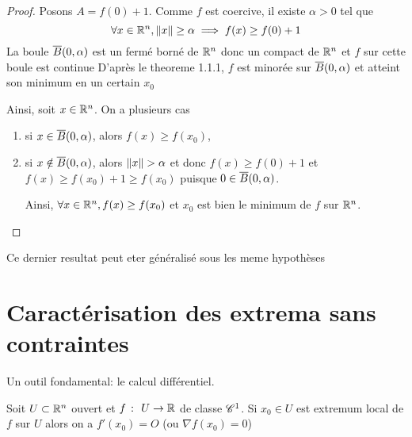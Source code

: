 \begin{proof}
    Posons \(A = f(0) + 1\). Comme \(f\) est coercive, il existe \(\alpha > 0\) tel que
    \begin{equation*}
        \forall x\in\mathbb{R}^n, \mathopen{}\left\|x\right\|\mathclose{}\geq \alpha \implies f(x) \geq  f(0) + 1
    \end{equation*}
    La boule \(\overline{B}(0, \alpha)\) est un fermé borné de \(\mathbb{R}^n\) %
    donc un compact de \(\mathbb{R}^n\) et \(f\) sur cette boule est continue %
    D'après le theoreme 1.1.1, \(f\) est minorée sur \(\overline{B}(0, \alpha)\) et atteint son minimum en un certain  %
    \(x_0\)

    Ainsi, soit \(x\in\mathbb{R}^n\). On a plusieurs cas
    \begin{enumerate}[label = (\alpha*)]
        \item si \(x\in \overline{B}(0, \alpha)\), alors \(f(x)\geq f(x_0)\),

        \item si \(x\notin \overline{B}(0, \alpha)\), alors \(\mathopen{}\left\|x\right\|\mathclose{} > \alpha\) et 
        donc \(f(x)\geq f(0) + 1\) et \(f(x)\geq f(x_0) + 1 \geq f(x_0)\)
        puisque \(0\in \overline{B}(0, \alpha)\).

        Ainsi, \(\forall x\in\mathbb{R}^n, f(x)\geq f(x_0)\) et \(x_0\)
        est bien le minimum de \(f\) sur \(\mathbb{R}^n\).
    \end{enumerate}
\end{proof}

\begin{remark}
    Ce dernier resultat peut eter généralisé sous les meme hypothèses

\end{remark}

\section{Caractérisation des extrema sans contraintes}

Un outil fondamental: le calcul différentiel.

\begin{theorem}
    Soit \(U\subset \mathbb{R}^n\) ouvert et \(f\ \colon\ U\to \mathbb{R}\) de classe \(\mathscr{C}^1\).
    Si \(x_0\in U\) est extremum local de \(f\) sur \(U\) alors on a 
    \(f'(x_0) = O\) (ou \(\nabla f(x_0)=0\))
\end{theorem}

